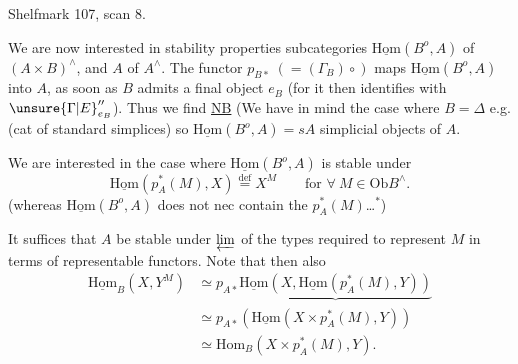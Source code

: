 Shelfmark 107, scan 8.

We are now interested in stability properties  subcategories \(\underline{\mathrm{Hom}}(B^o,A)\) of \((A\times B)^\wedge\), and \(A\) of \(A^\wedge\). The functor \(p_{B*}\;(=(\Gamma_B)\circ)\) maps  \(\underline{\mathrm{Hom}}(B^o,A)\) into \(A\), as soon as \(B\) admits a final object \(e_B\) (for it then identifies with \(\unsure{\Gamma|E}_{e_B}''\)). Thus we find
\uline{NB} (We have in mind the case where \(B=\Delta\) e.g. (cat of standard simplices) so \(\underline{\mathrm{Hom}}(B^o,A)=sA\) simplicial objects of \(A\).

 We are interested  in the case where \(\underline{\mathrm{Hom}}(B^o,A)\) is stable under
\[\underline{\mathrm{Hom}}(p_A^*(M),X)\overset{\mathrm{def}}=X^M\qquad\text{for }\forall\ M\in\mathrm{Ob}B^\wedge.\]
(whereas \(\underline{\mathrm{Hom}}(B^o,A)\) does not nec contain the \(p_A^*(M)\)\ldots\(^{*}\))

It suffices that \(A\) be stable under \(\varprojlim\) of the types required to represent \(M\)  in terms of representable functors.
Note that then also
\[
\begin{aligned}
\underline{\mathrm{Hom}}_B(X,Y^M)&\simeq p_{A*}\underbrace{\underline{\mathrm{Hom}}(X,\underline{\mathrm{Hom}}(p_A^*(M),Y))}\\
&\simeq p_{A*}(\underline{\mathrm{Hom}}(X\times p_A^*(M),Y))\\
&\simeq\mathrm{Hom}_B(X\times p_A^*(M),Y).
\end{aligned}
\]
